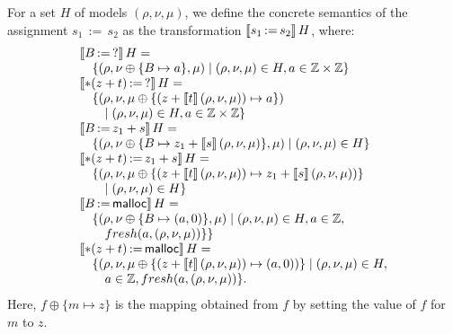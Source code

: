 For a set $H$ of models $(\rho,\nu,\mu)$, we define the concrete semantics of the assignment
$s_1\,{:=}\,s_2$ as the transformation
$\llbracket s_1\,{:=}\,s_2\rrbracket\,H$, where:
\[
	\begin{array}{l}
		\llbracket B\,{:=}\,?\rrbracket\,H =
		\\
		\quad \{(\rho,\nu\oplus\{B\mapsto a\},\mu)\mid(\rho,\nu,\mu)\in H,a\in\mathbb{Z} \times \mathbb{Z}\}                    \\
		\llbracket*(z+t)\,{:=}\,?\rrbracket\,H =                                                                     \\
		\quad \{(\rho,\nu,\mu\oplus\{(z+\llbracket t\rrbracket\,(\rho,\nu,\mu))\mapsto a\})                           \\
		\quad\quad\mid(\rho,\nu,\mu)\in H,a\in\mathbb{Z} \times \mathbb{Z}\}                                                    \\
		\llbracket B\,{:=}\,z_1+s\rrbracket\,H =                                                                      \\
		\quad \{(\rho,\nu\oplus\{B\mapsto z_1+\llbracket s\rrbracket\,(\rho,\nu,\mu)\},\mu)\mid(\rho,\nu,\mu)\in H\}  \\
		\llbracket*(z+t)\,{:=}\,z_1+s\rrbracket\,H =                                                                 \\
		\quad \{(\rho,\nu,\mu\oplus\{(z+\llbracket t\rrbracket\,(\rho,\nu,\mu))\mapsto z_1+\llbracket s\rrbracket\,(\rho,\nu,\mu))\} \\
		\quad\quad\mid(\rho,\nu,\mu)\in H\}                                                            \\
		\llbracket B\,{:=}\,\textsf{malloc}\rrbracket\,H =                                                                    \\
		\quad \{(\rho,\nu\oplus\{B\mapsto (a,0)\},\mu)\mid
		(\rho,\nu,\mu)\in H, a\in \mathbb{Z},                                                                 \\
		\quad\quad  fresh(a, (\rho,\nu,\mu))\}\}                                                       \\
		\llbracket*(z+t)\,{:=}\,\textsf{malloc}\rrbracket\,H =                                                               \\
		\quad \{(\rho,\nu,\mu\oplus\{(z+\llbracket t\rrbracket\,(\rho,\nu,\mu))\mapsto (a,0))\}\mid
		(\rho,\nu,\mu)\in H,                                                                           \\
		\quad\quad a\in \mathbb{Z}, fresh(a, (\rho, \nu, \mu))\}.
	\end{array}
\]
Here,
$f\oplus\{m\mapsto z\}$ is the mapping obtained
from $f$ by
setting the value of $f$ for $m$ to $z$.

